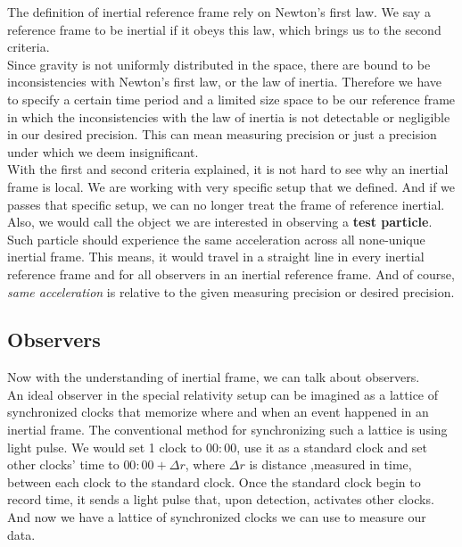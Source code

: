 \documentclass[11pt,letterpaper]{book}
\begin{document}
The definition of inertial reference frame rely on Newton's first law. We say a reference frame to be inertial if it obeys this law, which brings us to the second criteria.\\

Since gravity is not uniformly distributed in the space, there are bound to be inconsistencies with Newton's first law, or the law of inertia. Therefore we have to specify a certain time period and a limited size space to be our reference frame in which the inconsistencies with the law of inertia is not detectable or negligible in our desired precision. This can mean measuring precision or just a precision under which we deem insignificant. \\

With the first and second criteria explained, it is not hard to see why an inertial frame is local. We are working with very specific setup that we defined. And if we passes that specific setup, we can no longer treat the frame of reference inertial.\\

Also, we would call the object we are interested in observing a \textbf{test particle}. Such particle should experience the same acceleration across all none-unique inertial frame. This means, it would travel in a straight line in every inertial reference frame and for all observers in an inertial reference frame. And of course, \textit{same acceleration} is relative to the given measuring precision or desired precision. 

\subsection{Observers}
Now with the understanding of inertial frame, we can talk about observers.\\

An ideal observer in the special relativity setup can be imagined as a lattice of synchronized clocks that memorize where and when an event happened in an inertial frame. The conventional method for synchronizing such a lattice is using light pulse. We would set 1 clock to $00:00$, use it as a standard clock and set other clocks' time to $00:00+\Delta r$, where $\Delta r$ is distance ,measured in time, between each clock to the standard clock. Once the standard clock begin to record time, it sends a light pulse that, upon detection, activates other clocks. And now we have a lattice of synchronized clocks we can use to measure our data.\\
\end{document}
